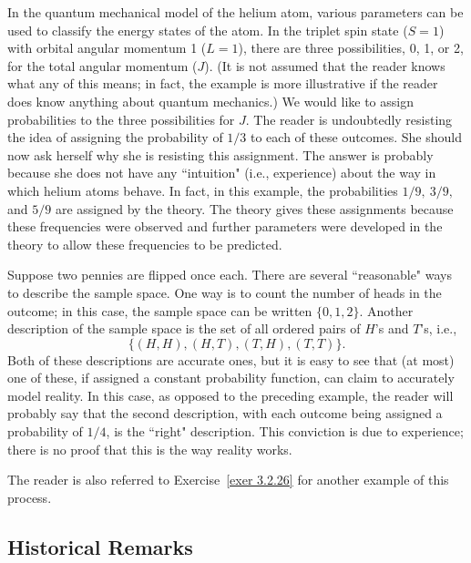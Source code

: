 \begin{example}\label{exam 3.14}
 In the quantum mechanical model of the helium atom, various
parameters can be used to classify the energy states of the atom.  In the triplet spin state ($S =
1$) with orbital angular momentum 1 ($L = 1$), there are three possibilities, 0, 1, or 2, for
the total angular momentum ($J$).  (It is not assumed that the reader knows what any
of this means; in fact, the example is more illustrative if the reader does 
know anything about quantum mechanics.)  We would like to assign probabilities to the
three possibilities for $J$.  The reader is undoubtedly resisting the idea of
assigning the probability of $1/3$ to each of these outcomes.  She should now ask
herself why she is resisting this assignment.   The answer is probably because she
does not have any ``intuition" (i.e., experience) about the way in which helium atoms
behave.  In fact, in this example, the probabilities $1/9,\ 3/9,$ and $5/9$ are
assigned by the theory.  The theory gives these assignments because these frequencies
were observed  and further parameters were developed in the theory
to allow these frequencies to be predicted.
\end{example}

\begin{example}\label{exam 3.15}  Suppose two pennies are flipped once each.   There
are several ``reasonable" ways to describe the sample space.  One way is to  count the
number of heads in the outcome; in this case, the sample space can be written $\{0, 1,
2\}$.  Another description of the sample space is the set of all  ordered pairs of
$H$'s and $T$'s, i.e., \[ \{(H,H), (H, T), (T, H), (T, T)\}. \]      
\noindent Both of these
descriptions are accurate ones, but it is easy to see that (at most) one of these, if
assigned a constant probability function, can claim to accurately model reality.  In
this case, as opposed to the preceding example, the reader will probably say that the
second description, with each outcome being assigned a probability of $1/4$, is the
``right" description.  This conviction is due to experience; there is no proof that
this is the way reality works.
\end{example} 
\par
The reader is also referred to Exercise~\ref{exer 3.2.26} for another example of this process.

\subsection*{Historical Remarks}

